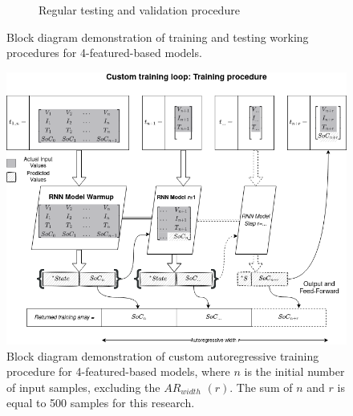 {\begin{figure}[htbp]
\begin{subfigure}[b]{0.85\textwidth}
            \caption{Regular testing and validation procedure}
            \label{subfig:testing}
        \end{subfigure}
        \caption{Block diagram demonstration of training and testing working procedures for 4-featured-based models.}
        \label{fig:training_testing}
    \end{figure}
} {
    \begin{figure}[!t]
        \centering
        \includegraphics[width=\linewidth]{II_Body/images/Autoregression_updated-Training.png}
        \caption{Block diagram demonstration of custom autoregressive training procedure for 4-featured-based models, where $n$ is the initial number of input samples, excluding the $AR_{width}$ $(r)$. The sum of $n$ and $r$ is equal to 500 samples for this research.}
        \label{fig:training_testing}
    \end{figure}
}


